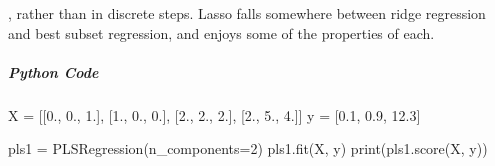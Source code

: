, rather than in discrete steps. Lasso falls
somewhere between ridge regression and best subset regression, and enjoys some of the
properties of each.

\subparagraph{Python Code}
\begin{python}
X = [[0., 0., 1.], [1., 0., 0.], [2., 2., 2.], [2., 5., 4.]]
y = [0.1, 0.9, 12.3]

pls1 = PLSRegression(n_components=2)
pls1.fit(X, y)
print(pls1.score(X, y))
\end{python}

